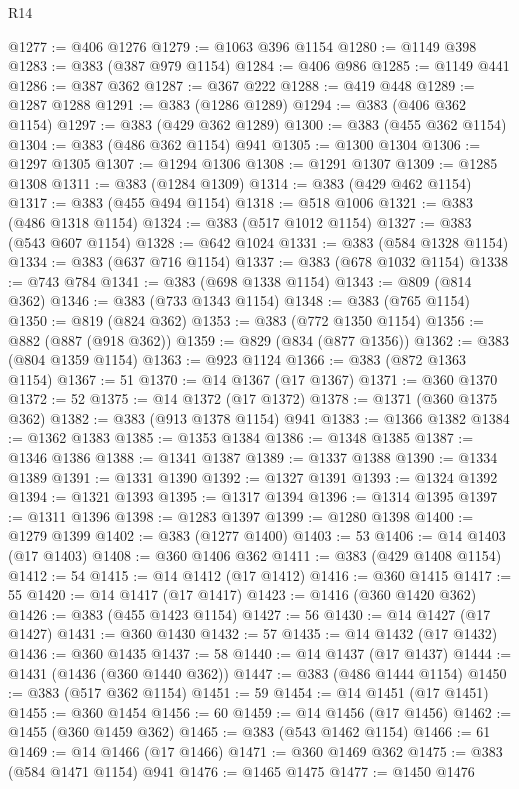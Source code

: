 \begin{lexlean}{R14}
\begin{coremodule}
@1277 := @406 @1276
@1279 := @1063 @396 @1154
@1280 := @1149 @398
@1283 := @383 (@387 @979 @1154)
@1284 := @406 @986
@1285 := @1149 @441
@1286 := @387 @362
@1287 := @367 @222
@1288 := @419 @448
@1289 := @1287 @1288
@1291 := @383 (@1286 @1289)
@1294 := @383 (@406 @362 @1154)
@1297 := @383 (@429 @362 @1289)
@1300 := @383 (@455 @362 @1154)
@1304 := @383 (@486 @362 @1154) @941
@1305 := @1300 @1304
@1306 := @1297 @1305
@1307 := @1294 @1306
@1308 := @1291 @1307
@1309 := @1285 @1308
@1311 := @383 (@1284 @1309)
@1314 := @383 (@429 @462 @1154)
@1317 := @383 (@455 @494 @1154)
@1318 := @518 @1006
@1321 := @383 (@486 @1318 @1154)
@1324 := @383 (@517 @1012 @1154)
@1327 := @383 (@543 @607 @1154)
@1328 := @642 @1024
@1331 := @383 (@584 @1328 @1154)
@1334 := @383 (@637 @716 @1154)
@1337 := @383 (@678 @1032 @1154)
@1338 := @743 @784
@1341 := @383 (@698 @1338 @1154)
@1343 := @809 (@814 @362)
@1346 := @383 (@733 @1343 @1154)
@1348 := @383 (@765 @1154)
@1350 := @819 (@824 @362)
@1353 := @383 (@772 @1350 @1154)
@1356 := @882 (@887 (@918 @362))
@1359 := @829 (@834 (@877 @1356))
@1362 := @383 (@804 @1359 @1154)
@1363 := @923 @1124
@1366 := @383 (@872 @1363 @1154)
@1367 := 51
@1370 := @14 @1367 (@17 @1367)
@1371 := @360 @1370
@1372 := 52
@1375 := @14 @1372 (@17 @1372)
@1378 := @1371 (@360 @1375 @362)
@1382 := @383 (@913 @1378 @1154) @941
@1383 := @1366 @1382
@1384 := @1362 @1383
@1385 := @1353 @1384
@1386 := @1348 @1385
@1387 := @1346 @1386
@1388 := @1341 @1387
@1389 := @1337 @1388
@1390 := @1334 @1389
@1391 := @1331 @1390
@1392 := @1327 @1391
@1393 := @1324 @1392
@1394 := @1321 @1393
@1395 := @1317 @1394
@1396 := @1314 @1395
@1397 := @1311 @1396
@1398 := @1283 @1397
@1399 := @1280 @1398
@1400 := @1279 @1399
@1402 := @383 (@1277 @1400)
@1403 := 53
@1406 := @14 @1403 (@17 @1403)
@1408 := @360 @1406 @362
@1411 := @383 (@429 @1408 @1154)
@1412 := 54
@1415 := @14 @1412 (@17 @1412)
@1416 := @360 @1415
@1417 := 55
@1420 := @14 @1417 (@17 @1417)
@1423 := @1416 (@360 @1420 @362)
@1426 := @383 (@455 @1423 @1154)
@1427 := 56
@1430 := @14 @1427 (@17 @1427)
@1431 := @360 @1430
@1432 := 57
@1435 := @14 @1432 (@17 @1432)
@1436 := @360 @1435
@1437 := 58
@1440 := @14 @1437 (@17 @1437)
@1444 := @1431 (@1436 (@360 @1440 @362))
@1447 := @383 (@486 @1444 @1154)
@1450 := @383 (@517 @362 @1154)
@1451 := 59
@1454 := @14 @1451 (@17 @1451)
@1455 := @360 @1454
@1456 := 60
@1459 := @14 @1456 (@17 @1456)
@1462 := @1455 (@360 @1459 @362)
@1465 := @383 (@543 @1462 @1154)
@1466 := 61
@1469 := @14 @1466 (@17 @1466)
@1471 := @360 @1469 @362
@1475 := @383 (@584 @1471 @1154) @941
@1476 := @1465 @1475
@1477 := @1450 @1476

\end{coremodule}
\end{lexlean}

